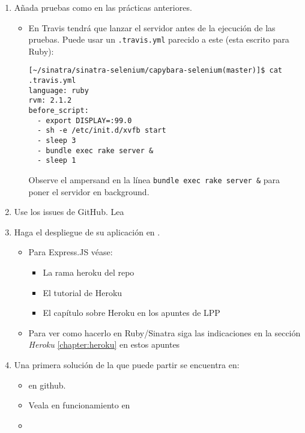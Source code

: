 \begin{enumerate}
\item
Añada pruebas  como en las prácticas anteriores. 
\begin{itemize}
\item
En Travis tendrá que lanzar el servidor antes de la ejecución de las pruebas.
Puede usar un \verb|.travis.yml| parecido a este (esta escrito para Ruby):
\begin{verbatim}
[~/sinatra/sinatra-selenium/capybara-selenium(master)]$ cat .travis.yml 
language: ruby
rvm: 2.1.2
before_script:
  - export DISPLAY=:99.0
  - sh -e /etc/init.d/xvfb start
  - sleep 3
  - bundle exec rake server & 
  - sleep 1
\end{verbatim}
Observe el ampersand en la línea
\verb|bundle exec rake server &| para poner el servidor en background.
\end{itemize}
\item
Use los issues de GitHub. Lea
\item
Haga el despliegue de su aplicación en 
.

\begin{itemize}
\item
Para Express.JS véase:
\begin{itemize}
\item
La rama heroku del repo 
\item
El tutorial de Heroku 
\item
El capítulo sobre Heroku en los apuntes de LPP
\end{itemize}

\item
Para ver como hacerlo en Ruby/Sinatra siga las indicaciones en la sección
{\it Heroku} \ref{chapter:heroku} en estos apuntes
\end{itemize}

\item  Una primera solución de la que puede partir se encuentra en:
\begin{itemize}
\item
{} en github. 
\item
Veala en funcionamiento en 
\item


\end{itemize}
\end{enumerate}
